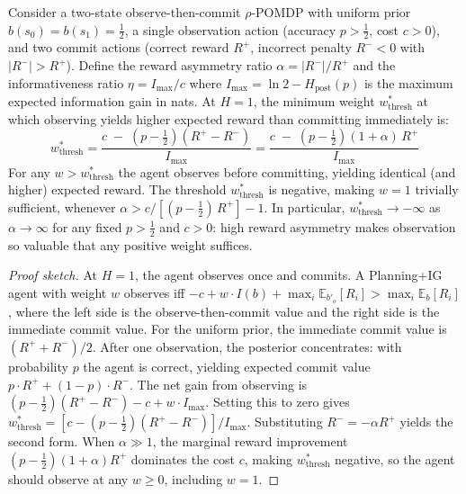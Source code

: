 \documentclass[runningheads]{llncs}
\begin{document}
\begin{proposition}
\label{prop:nearopt}
Consider a two-state observe-then-commit $\rho$-POMDP with uniform prior $b(s_0){=}b(s_1){=}\tfrac{1}{2}$, a single observation action (accuracy $p > \tfrac{1}{2}$, cost $c > 0$), and two commit actions (correct reward $R^+$, incorrect penalty $R^- < 0$ with $|R^-| > R^+$). Define the reward asymmetry ratio $\alpha = |R^-|/R^+$ and the informativeness ratio $\eta = I_{\max}/c$ where $I_{\max} = \ln 2 - H_{\text{post}}(p)$ is the maximum expected information gain in nats. At $H{=}1$, the minimum weight $w^*_{\mathrm{thresh}}$ at which observing yields higher expected reward than committing immediately is:
\begin{equation*}
    w^*_{\mathrm{thresh}} = \frac{c \;-\; \left(p - \tfrac{1}{2}\right)(R^+ - R^-)}{\,I_{\max}\,} = \frac{c \;-\; \left(p - \tfrac{1}{2}\right)(1 + \alpha)\,R^+}{\,I_{\max}\,}
\end{equation*}
For any $w > w^*_{\mathrm{thresh}}$ the agent observes before committing, yielding identical (and higher) expected reward. The threshold $w^*_{\mathrm{thresh}}$ is negative, making $w{=}1$ trivially sufficient, whenever $\alpha > c / [(p - \tfrac{1}{2})\,R^+] - 1$. In particular, $w^*_{\mathrm{thresh}} \to -\infty$ as $\alpha \to \infty$ for any fixed $p > \tfrac{1}{2}$ and $c > 0$: high reward asymmetry makes observation so valuable that any positive weight suffices.
\end{proposition}
\begin{proof}[Proof sketch]
At $H{=}1$, the agent observes once and commits. A Planning+IG agent with weight $w$ observes iff $-c + w \cdot I(b) + \max_i \mathbb{E}_{b'_o}[R_i] > \max_i \mathbb{E}_b[R_i]$, where the left side is the observe-then-commit value and the right side is the immediate commit value. For the uniform prior, the immediate commit value is $(R^+ + R^-)/2$. After one observation, the posterior concentrates: with probability $p$ the agent is correct, yielding expected commit value $p \cdot R^+ + (1-p) \cdot R^-$. The net gain from observing is $(p - \frac{1}{2})(R^+ - R^-) - c + w \cdot I_{\max}$. Setting this to zero gives $w^*_{\mathrm{thresh}} = [c - (p-\frac{1}{2})(R^+ - R^-)]/I_{\max}$. Substituting $R^- = -\alpha R^+$ yields the second form. When $\alpha \gg 1$, the marginal reward improvement $(p - \frac{1}{2})(1 + \alpha)R^+$ dominates the cost $c$, making $w^*_{\mathrm{thresh}}$ negative, so the agent should observe at any $w \geq 0$, including $w{=}1$.
\end{proof}
\end{document}
